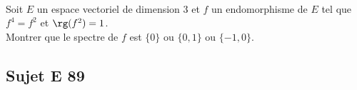 \documentclass[11pt]{article}
\begin{document}
\begin{exerciceSP}~\\
Soit $E$ un espace vectoriel de dimension $3$ et $f$ un endomorphisme 
de $E$ tel que $f^4=f^2$ et $\rg(f^2)=1$.\\
Montrer que le spectre de $f$ est $\{0\}$ ou $\{0,1\}$ ou $\{-1,0\}$.
\end{exerciceSP}




\subsection*{Sujet E 89}

\end{document}
